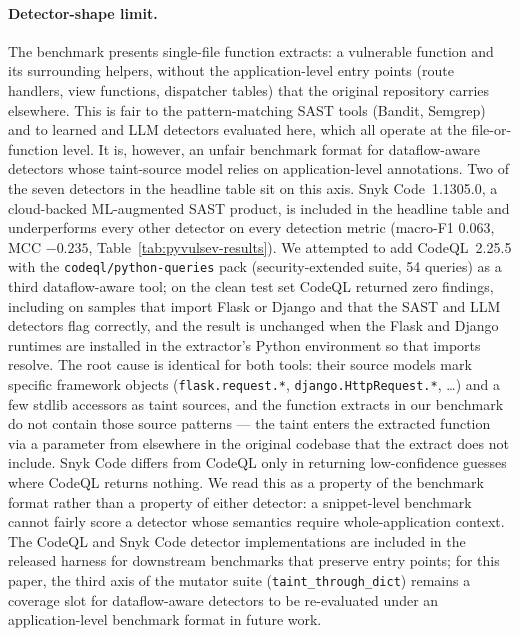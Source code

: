 \paragraph{Detector-shape limit.} The benchmark presents single-file
function extracts: a vulnerable function and its surrounding helpers,
without the application-level entry points (route handlers, view
functions, dispatcher tables) that the original repository carries
elsewhere. This is fair to the pattern-matching SAST tools (Bandit,
Semgrep) and to learned and LLM detectors evaluated here, which all
operate at the file-or-function level. It is, however, an unfair
benchmark format for dataflow-aware detectors whose taint-source
model relies on application-level annotations. Two of the seven
detectors in the headline table sit on this axis. Snyk
Code~1.1305.0, a cloud-backed ML-augmented SAST product, is included
in the headline table and underperforms every other detector on
every detection metric (macro-F1 0.063, MCC $-0.235$,
Table~\ref{tab:pyvulsev-results}). We attempted to add CodeQL~2.25.5
with the \texttt{codeql/python-queries} pack (security-extended
suite, 54 queries) as a third dataflow-aware tool; on the clean test
set CodeQL returned zero findings, including on samples that import
Flask or Django and that the SAST and LLM detectors flag correctly,
and the result is unchanged when the Flask and Django runtimes are
installed in the extractor's Python environment so that imports
resolve. The root cause is identical for both tools: their source
models mark specific framework objects (\texttt{flask.request.*},
\texttt{django.HttpRequest.*}, \ldots) and a few stdlib accessors as
taint sources, and the function extracts in our benchmark do not
contain those source patterns — the taint enters the extracted
function via a parameter from elsewhere in the original codebase
that the extract does not include. Snyk Code differs from CodeQL
only in returning low-confidence guesses where CodeQL returns
nothing. We read this as a property of the benchmark format rather
than a property of either detector: a snippet-level benchmark cannot
fairly score a detector whose semantics require whole-application
context. The CodeQL and Snyk Code detector implementations are
included in the released harness for downstream benchmarks that
preserve entry points; for this paper, the third axis of the mutator
suite (\texttt{taint\_through\_dict}) remains a coverage slot for
dataflow-aware detectors to be re-evaluated under an
application-level benchmark format in future work.

